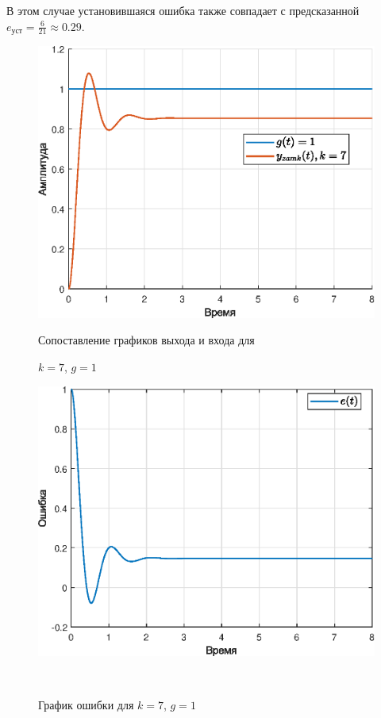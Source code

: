 \documentclass[a4paper]{article}
\begin{document}
В этом случае установившаяся ошибка также совпадает с предсказанной $e_{\text{уст}} =\frac{6}{21} \approx 0.29$.

\begin{figure}[H]
    \begin{minipage}{0.5\textwidth}
        \centering \includegraphics[width=\textwidth]{ex3/k7_g_a.eps}
        \caption{Сопоставление графиков выхода и входа для}
        \centerline{$k=7$, $g=1$}
    \end{minipage}\hfill
    \begin{minipage}{0.5\textwidth}
        \centering \includegraphics[width=\textwidth]{ex3/k7_g_a_error.eps}
        \caption{График ошибки для $k=7$, $g=1$}
    \end{minipage}\\[1em]
\end{figure}\noindent\
\end{document}
